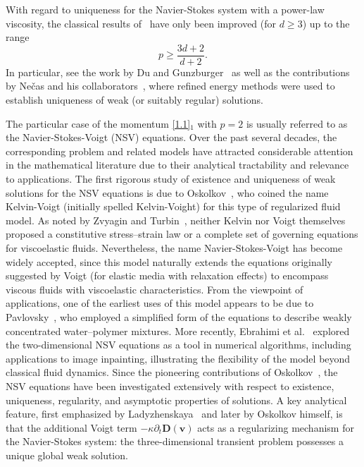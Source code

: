 \documentclass[12pt,reqno]{amsart}
\numberwithin{equation}{section}
\theoremstyle{definition}
\def\vv{\boldsymbol{v}}
\def\bfD{\mathbf{D}}
\begin{document}
With regard to uniqueness for the Navier-Stokes system with a power-law viscosity, the classical results of~\cite{Lady-Steklov-1967,Lady-LOMI-1968,Lions:1969} have only been improved (for $d\geq 3$) up to the range
\begin{equation*}
p \geq \frac{3d+2}{\,d+2\,}.
\end{equation*}
In particular, see the work by {Du and Gunzburger}~\cite{DuGunzburger} as well as the contributions by {Ne\v{c}as and his collaborators}~\cite{Necas:book:1996}, where refined energy methods were used to establish uniqueness of weak (or suitably regular) solutions.

The particular case of the momentum \eqref{1.1}$_1$ with $p=2$ is usually referred to as the Navier-Stokes-Voigt (NSV) equations.
Over the past several decades, the corresponding problem and related models have attracted considerable attention in the mathematical literature due to their analytical tractability and relevance to applications.
The first rigorous study of existence and uniqueness of weak solutions for the NSV equations is due to {Oskolkov}~\cite{Oskolkov:1973}, who coined the name Kelvin-Voigt (initially spelled Kelvin-Voight) for this type of regularized fluid model.
As noted by {Zvyagin and Turbin}~\cite{zvy-2010}, neither {Kelvin} nor {Voigt} themselves proposed a constitutive stress--strain law or a complete set of governing equations for viscoelastic fluids.
Nevertheless, the name Navier-Stokes-Voigt has become widely accepted, since this model naturally extends the equations originally suggested by {Voigt} (for elastic media with relaxation effects) to encompass viscous fluids with viscoelastic characteristics.
From the viewpoint of applications, one of the earliest uses of this model appears to be due to {Pavlovsky}~\cite{Pav-1971}, who employed a simplified form of the equations to describe weakly concentrated water--polymer mixtures.
More recently, {Ebrahimi et al.}~\cite{EHL:2013} explored the two-dimensional NSV equations as a tool in numerical algorithms, including applications to image inpainting, illustrating the flexibility of the model beyond classical fluid dynamics.
Since the  pioneering contributions of {Oskolkov}~\cite{Oskolkov:1973}, the NSV equations have been investigated extensively with respect to existence, uniqueness, regularity, and asymptotic properties of solutions.
A key analytical feature, first emphasized by {Ladyzhenskaya}~\cite{Ladyzhenskaya:1966} and later by {Oskolkov} himself, is that the additional Voigt term $-\kappa\partial_t\bfD(\vv)$ acts as a regularizing mechanism for the Navier-Stokes system: the three-dimensional transient problem possesses a unique global weak solution.
\end{document}
